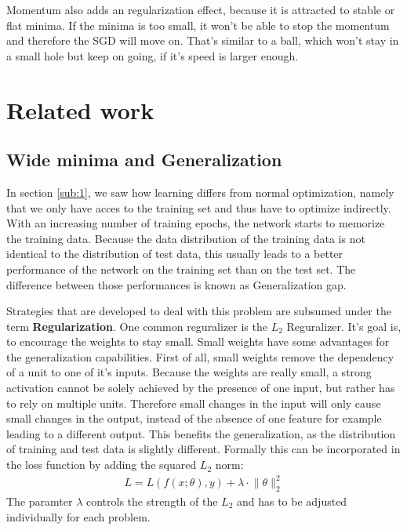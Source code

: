 Momentum also adds an regularization effect, because it is attracted to stable
or flat minima. If the minima is too small, it won't be able to stop the
momentum and therefore the SGD will move on. That's similar to a ball, which
won't stay in a small hole but keep on going, if it's speed is larger enough.






\section{Related work}
\subsection{Wide minima and Generalization}\label{sub:Generalization}
In section \ref{sub:1}, we saw how learning differs from normal optimization,
namely that we only have acces to the training set and thus have to optimize
indirectly. With an increasing number of training epochs, the network starts to
memorize the training data. Because the data distribution of the training data
is not identical to the distribution of test data, this usually leads to a
better performance of the network on the training set than on the test set. The
difference between those performances is known as Generalization gap. 

Strategies that are developed to deal with this problem are subsumed under the
term \textbf{Regularization}. One common reguralizer is the $L_2$ Reguralizer.
It's goal is, to encourage the weights to stay small. Small weights have some
advantages for the generalization capabilities. First of all, small weights
remove the dependency of a unit to one of it's inputs. Because the weights are
really small, a strong activation cannot be solely achieved by the presence of
one input, but rather has to rely on multiple units. Therefore small changes in
the input will only cause small changes in the output, instead of the absence of
one feature for example leading to a different output. This benefits the
generalization, as the distribution of training and test data is slightly
different. Formally this can be incorporated in the loss function by adding the
squared $L_2$ norm:
\begin{align}
    L= L(f(x;\theta), y)+\lambda \cdot \lVert \theta \rVert_2^2
\end{align}
The paramter $\lambda$ controls the strength of the $L_2$ and has to be adjusted individually
for each problem.

